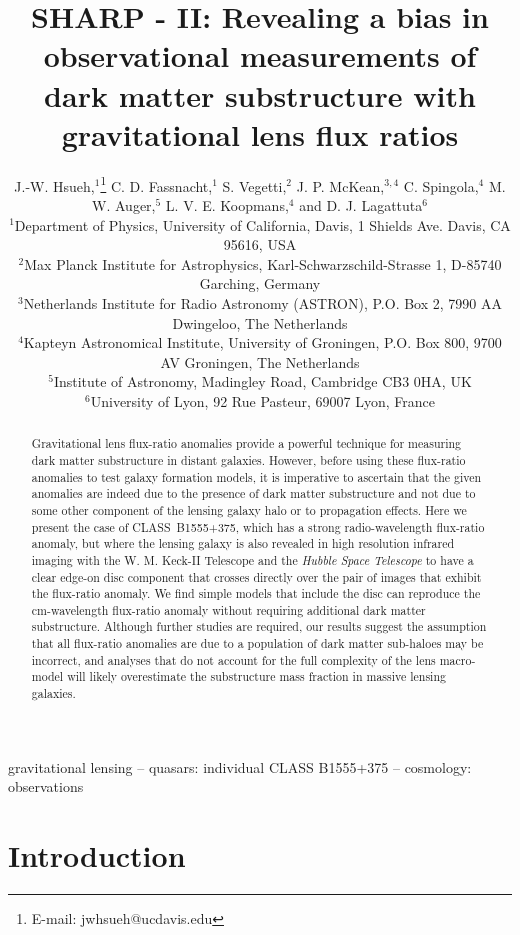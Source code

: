 \documentclass[a4paper,fleqn,usenatbib,useAMS]{mnras}
\title[Beware the effect of edge-on discs]{SHARP - II: Revealing a bias in observational measurements of dark matter substructure with gravitational lens flux ratios}
\author[Hsueh et al.]{J.-W. Hsueh,$^{1}$\thanks{E-mail: jwhsueh@ucdavis.edu} C. D. Fassnacht,$^{1}$ S. Vegetti,$^{2}$  J. P. McKean,$^{3,4}$ C. Spingola,$^{4}$ M. W. Auger,$^{5}$
\newauthor  L. V. E. Koopmans,$^{4}$ and D. J. Lagattuta$^{6}$\\
$^{1}$Department of Physics, University of California, Davis, 1 Shields Ave. Davis, CA 95616, USA\\
$^{2}$Max Planck Institute for Astrophysics, Karl-Schwarzschild-Strasse 1, D-85740 Garching, Germany\\
$^{3}$Netherlands Institute for Radio Astronomy (ASTRON), P.O. Box 2, 7990 AA Dwingeloo, The Netherlands\\
$^{4}$Kapteyn Astronomical Institute, University of Groningen, P.O. Box 800, 9700 AV Groningen, The Netherlands\\
$^{5}$Institute of Astronomy, Madingley Road, Cambridge CB3 0HA, UK\\
$^{6}$University of Lyon, 92 Rue Pasteur, 69007 Lyon, France}
\begin{document}

\pagerange{\pageref{firstpage}--\pageref{lastpage}} 

\maketitle

\label{firstpage}

\begin{abstract}
Gravitational lens flux-ratio anomalies provide a powerful technique for measuring dark matter substructure in distant galaxies. However, before using these flux-ratio anomalies to test galaxy formation models, it is imperative to ascertain that the given anomalies are indeed due to the presence of dark matter substructure and not due to some other component of the lensing galaxy halo or to propagation effects. Here we present the case of CLASS~B1555+375, which has a strong radio-wavelength flux-ratio anomaly, but where the lensing galaxy is also revealed in high resolution infrared imaging with the W. M. Keck-II Telescope and the {\it Hubble Space Telescope} to have a clear edge-on disc component that crosses directly over the pair of images that exhibit the flux-ratio anomaly. We find simple models that include the disc can reproduce the cm-wavelength flux-ratio anomaly without requiring additional dark matter substructure. Although further studies are required, our results suggest the assumption that all flux-ratio anomalies are due to a population of dark matter sub-haloes may be incorrect, and analyses that do not account for the full complexity of the lens macro-model will likely overestimate the substructure mass fraction in massive lensing galaxies.
\end{abstract}

\begin{keywords}
gravitational lensing -- quasars: individual CLASS B1555+375 -- cosmology: observations 
\end{keywords}

\section{Introduction}
\end{document}
